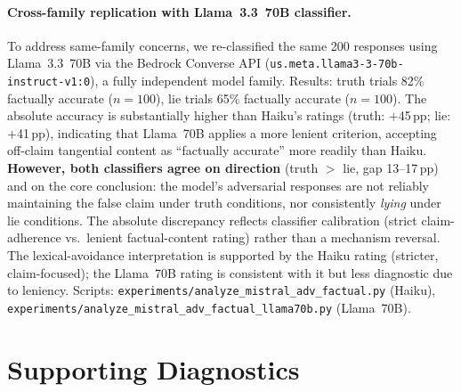 \paragraph{Cross-family replication with Llama~3.3~70B classifier.} To address same-family concerns, we re-classified the same 200 responses using Llama~3.3~70B via the Bedrock Converse API (\texttt{us.meta.llama3-3-70b-instruct-v1:0}), a fully independent model family. Results: truth trials 82\% factually accurate ($n\!=\!100$), lie trials 65\% factually accurate ($n\!=\!100$). The absolute accuracy is substantially higher than Haiku's ratings (truth: $+$45\,pp; lie: $+$41\,pp), indicating that Llama~70B applies a more lenient criterion, accepting off-claim tangential content as ``factually accurate'' more readily than Haiku. \textbf{However, both classifiers agree on direction} (truth $>$ lie, gap 13--17\,pp) and on the core conclusion: the model's adversarial responses are not reliably maintaining the false claim under truth conditions, nor consistently \emph{lying} under lie conditions. The absolute discrepancy reflects classifier calibration (strict claim-adherence vs.\ lenient factual-content rating) rather than a mechanism reversal. The lexical-avoidance interpretation is supported by the Haiku rating (stricter, claim-focused); the Llama~70B rating is consistent with it but less diagnostic due to leniency. Scripts: \texttt{experiments/analyze\_mistral\_adv\_factual.py} (Haiku), \texttt{experiments/analyze\_mistral\_adv\_factual\_llama70b.py} (Llama~70B).\label{tab:adv_qualitative_summary}

\section{Supporting Diagnostics}
\label{app:supporting_diagnostics}
\label{sec:pipeline_ablation}
\label{sec:scale_transfer_cf}
\label{sec:qwen_scale_sweep}
\label{sec:cross_family_equalized}
\label{sec:saplma_application}
\label{sec:rlhf_replication}
\label{sec:autonomous_pilot}
\label{sec:autonomous_matched}
\label{sec:exp_i_4th_scenario}\label{sec:exp_i_5th_scenario}\label{sec:factorial_2x2}

